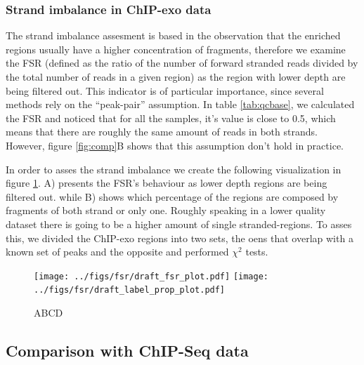 \documentclass{bmcart}\usepackage[]{graphicx}\usepackage[]{color}
\begin{document}
\subsubsection{Strand imbalance in ChIP-exo data}
\label{sec:strand_imbalance}

The strand imbalance assesment is based in the observation that the
enriched regions usually have a higher concentration of fragments,
therefore we examine the FSR (defined as the ratio of the number of
forward stranded reads divided by the total number of reads in a given
region) as the region with lower depth are being filtered out. This
indicator is of particular importance, since several methods rely on
the ``peak-pair'' assumption. In table \ref{tab:qcbase}, we calculated
the FSR and noticed that for all the samples, it's value is close to
0.5, which means that there are roughly the same amount of reads in
both strands. However, figure \ref{fig:comp}B shows that this
assumption don't hold in practice. 

In order to asses the strand imbalance we create the following
visualization in figure \ref{fig:strand}. A) presents the FSR's
behaviour as lower depth regions are being filtered out. while B)
shows which percentage of the regions are composed by fragments of
both strand or only one. Roughly speaking in a lower quality dataset
there is going to be a higher amount of single stranded-regions. To
asses this, we divided the ChIP-exo regions into two sets, the oens
that overlap with a known set of peaks and the opposite and performed
$\chi^2$ tests.

\begin{figure}[h!]
  \centering  
  \texttt{[image: ../figs/fsr/draft\_fsr\_plot.pdf]}
  \texttt{[image: ../figs/fsr/draft\_label\_prop\_plot.pdf]}
  \caption{ABCD}
  \label{fig:strand}
\end{figure}



\subsection{Comparison with ChIP-Seq data}
\label{sec:comp}
\end{document}
